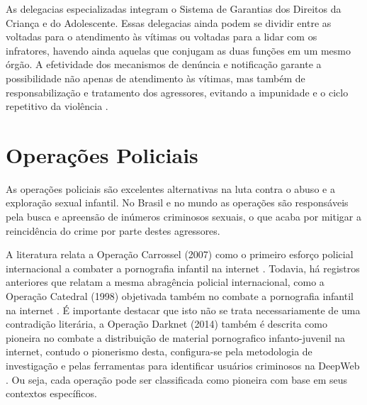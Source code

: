 As delegacias especializadas integram o Sistema de Garantias dos Direitos da Criança e do Adolescente. Essas delegacias ainda podem se dividir entre as voltadas para o atendimento às vítimas ou voltadas para a lidar com os infratores, havendo ainda aquelas que conjugam as duas funções em um mesmo órgão. A efetividade dos mecanismos de denúncia e notificação garante a possibilidade não apenas de atendimento às vítimas, mas também de responsabilização e tratamento dos agressores, evitando a impunidade e o ciclo repetitivo da violência \cite{novo2016}.





\section{Operações Policiais}\label{sec:op}

As operações policiais são excelentes alternativas na luta contra o abuso e a exploração sexual infantil. No Brasil e no mundo as operações são responsáveis pela busca e apreensão de inúmeros criminosos sexuais, o que acaba por mitigar a reincidência do crime por parte destes agressores. 

A literatura relata a Operação Carrossel (2007) como o primeiro esforço policial internacional a combater a pornografia infantil na internet \cite{lowenkron2014all}. Todavia, há registros anteriores que relatam a mesma abragência policial internacional, como a Operação Catedral (1998) objetivada também no combate a pornografia infantil na internet \cite{Barrot2008, jesus2006anti}. É importante destacar que isto não se trata necessariamente de uma contradição literária, a Operação Darknet (2014) também é descrita como pioneira no combate a distribuição de material pornografico infanto-juvenil na internet, contudo o pionerismo desta, configura-se pela metodologia de investigação e pelas ferramentas para identificar usuários criminosos na DeepWeb \cite{tonello2018pedofilia}. Ou seja, cada operação pode ser classificada como pioneira com base em seus contextos específicos. 

